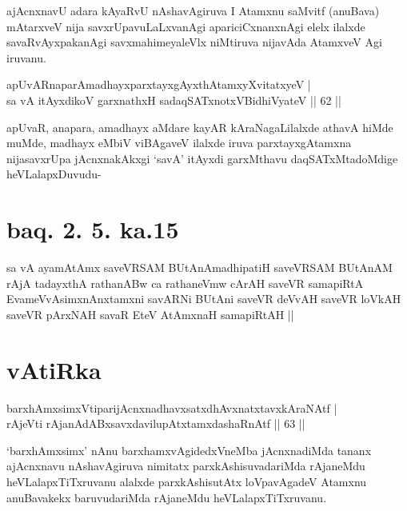 \begin{artha}
ajAcnxnavU adara kAyaRvU nAshavAgiruva I Atamxnu saMvitf (anuBava) mAtarxveV nija savxrUpavuLaLxvanAgi apariciCxnanxnAgi elelx ilalxde savaRvAyxpakanAgi savxmahimeyaleVlx niMtiruva nijavAda AtamxveV Agi iruvanu.
\end{artha}


\begin{shl}
apUvARnaparAmadhayxparxtayxgAyxthAtamxyXvitatxyeV |\\
sa vA itAyxdikoV garxnathxH sadaqSATxnotxV\s BidhiVyateV \hfill || 62 ||
\end{shl}

\begin{artha}
apUvaR, anapara, amadhayx aMdare kayAR kAraNagaLilalxde athavA hiMde
muMde, madhayx eMbiV viBAgaveV ilalxde iruva parxtayxgAtamxna
nijasavxrUpa jAcnxnakAkxgi `savA' itAyxdi garxMthavu daqSATxMtadoMdige
heVLalapxDuvudu-
\end{artha}

\section*{baq. 2. 5. ka.15}

\begin{shl}
sa vA ayamAtAmx saveVRSAM BUtAnAmadhipatiH saveVRSAM BUtAnAM rAjA tadayxthA rathanABw ca rathaneVmw cArAH saveVR samapiRtA EvameVvAsimxnAnxtamxni savARNi BUtAni saveVR deVvAH saveVR loVkAH saveVR pArxNAH savaR EteV AtAmxnaH samapiRtAH ||
\end{shl}


\section*{vAtiRka}


\begin{shl}
barxhAmxsimxVtiparijAcnxnadhavxsatxdhAvxnatxtavxkAraNAtf |\\
rAjeVti rAjanAdABxsavxdavilupAtxtamxdashaRnAtf \hfill || 63 ||
\end{shl}
\begin{artha}
`barxhAmxsimx' nAnu barxhamxvAgidedxVneMba jAcnxnadiMda tananx   ajAcnxnavu nAshavAgiruva nimitatx parxkAshisuvadariMda rAjaneMdu   heVLalapxTiTxruvanu alalxde parxkAshisutAtx loVpavAgadeV Atamxnu   anuBavakekx baruvudariMda rAjaneMdu heVLalapxTiTxruvanu.
\end{artha}

